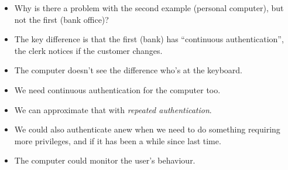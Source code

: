 \begin{frame}
  \begin{exercise}
    \begin{itemize}
      \item Why is there a problem with the second example (personal computer), 
        but not the first (bank office)?
    \end{itemize}
  \end{exercise}
\end{frame}

\begin{frame}
  \begin{remark}
    \begin{itemize}
      \item The key difference is that the first (bank) has \enquote{continuous 
          authentication}, the clerk notices if the customer changes.

      \item The computer doesn't see the difference who's at the keyboard.
      \item We need continuous authentication for the computer too.
    \end{itemize}
  \end{remark}

  \pause

  \begin{solution}
    \begin{itemize}
      \item We can approximate that with \emph{repeated authentication}.

      \item We could also authenticate anew when we need to do something 
        requiring more privileges, and if it has been a while since last time.

      \item The computer could monitor the user's behaviour.
    \end{itemize}
  \end{solution}
\end{frame}




\begin{frame}[allowframebreaks]
	\small
  \printbibliography{}
\end{frame}

